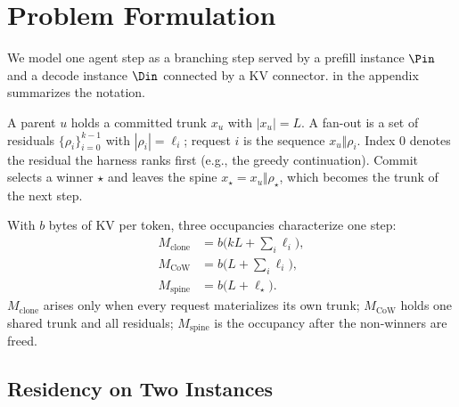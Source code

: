 \section{Problem Formulation}
\label{sec:problem}

We model one agent step as a branching step served by a prefill instance $\Pin$ and a decode instance $\Din$ connected by a KV connector.
 in the appendix summarizes the notation.

\begin{definition}
\label{def:step}
A parent $u$ holds a committed trunk $x_u$ with $|x_u|{=}L$.
A fan-out is a set of residuals $\{\rho_i\}_{i=0}^{k-1}$ with $|\rho_i|{=}\ell_i$; request $i$ is the sequence $x_u\Vert\rho_i$.
Index $0$ denotes the residual the harness ranks first (e.g., the greedy continuation).
Commit selects a winner $\star$ and leaves the spine $x_\star=x_u\Vert\rho_\star$, which becomes the trunk of the next step.
\end{definition}

With $b$ bytes of KV per token, three occupancies characterize one step:
\begin{align}
M_{\mathrm{clone}} &= b\bigl(kL+\textstyle\sum_i\ell_i\bigr), \label{eq:mem}\\
M_{\mathrm{CoW}} &= b\bigl(L+\textstyle\sum_i\ell_i\bigr), \nonumber\\
M_{\mathrm{spine}} &= b\bigl(L+\ell_\star\bigr). \nonumber
\end{align}
$M_{\mathrm{clone}}$ arises only when every request materializes its own trunk; $M_{\mathrm{CoW}}$ holds one shared trunk and all residuals; $M_{\mathrm{spine}}$ is the occupancy after the non-winners are freed.

\subsection{Residency on Two Instances}
\label{sec:residency}

